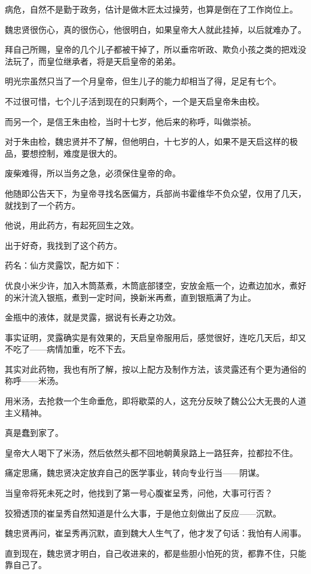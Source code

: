 \begin{multicols}{\theparacolNo}
		病危，自然不是勤于政务，估计是做木匠太过操劳，也算是倒在了工作岗位上。

		魏忠贤很伤心，真的很伤心，他很明白，如果皇帝大人就此挂掉，以后就难办了。

		拜自己所赐，皇帝的几个儿子都被干掉了，所以垂帘听政、欺负小孩之类的把戏没法玩了，而皇位继承者，将是天启皇帝的弟弟。

		明光宗虽然只当了一个月皇帝，但生儿子的能力却相当了得，足足有七个。

		不过很可惜，七个儿子活到现在的只剩两个，一个是天启皇帝朱由校。

		而另一个，是信王朱由检，当时十七岁，他后来的称呼，叫做崇祯。

		对于朱由检，魏忠贤并不了解，但他明白，十七岁的人，如果不是天启这样的极品，要想控制，难度是很大的。

		废柴难得，所以当务之急，必须保住皇帝的命。

		他随即公告天下，为皇帝寻找名医偏方，兵部尚书霍维华不负众望，仅用了几天，就找到了一个药方。

		他说，用此药方，有起死回生之效。

		出于好奇，我找到了这个药方。

		药名：仙方灵露饮，配方如下：

		优良小米少许，加入木筒蒸煮，木筒底部镂空，安放金瓶一个，边煮边加水，煮好的米汁流入银瓶，煮到一定时间，换新米再煮，直到银瓶满了为止。

		金瓶中的液体，就是灵露，据说有长寿之功效。

		事实证明，灵露确实是有效果的，天启皇帝服用后，感觉很好，连吃几天后，却又不吃了——病情加重，吃不下去。

		其实对此药物，我也有所了解，按以上配方及制作方法，该灵露还有个更为通俗的称呼——米汤。

		用米汤，去抢救一个生命垂危，即将歇菜的人，这充分反映了魏公公大无畏的人道主义精神。

		真是蠢到家了。

		皇帝大人喝下了米汤，然后依然头都不回地朝黄泉路上一路狂奔，拉都拉不住。

		痛定思痛，魏忠贤决定放弃自己的医学事业，转向专业行当——阴谋。

		当皇帝将死未死之时，他找到了第一号心腹崔呈秀，问他，大事可行否？

		狡猾透顶的崔呈秀自然知道是什么大事，于是他立刻做出了反应——沉默。

		魏忠贤再问，崔呈秀再沉默，直到魏大人生气了，他才发了句话：我怕有人闹事。

		直到现在，魏忠贤才明白，自己收进来的，都是些胆小怕死的货，都靠不住，只能靠自己了。


\end{multicols}
